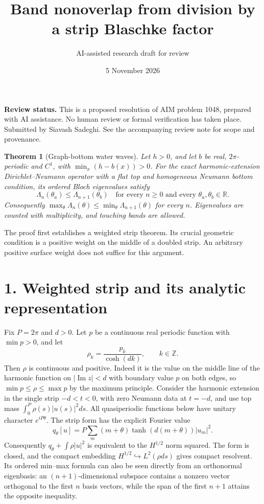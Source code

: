 \documentclass[11pt]{article}
\newtheorem{theorem}{Theorem}
\begin{document}
\title{Band nonoverlap from division by a strip Blaschke factor}
\author{AI-assisted research draft for review}
\date{5 November 2026}
\maketitle
\noindent\textbf{Review status.} This is a proposed resolution of AIM problem
1048, prepared with AI assistance. No human review or formal verification
has taken place. Submitted by Siavash Sadeghi. See the accompanying review
note for scope and provenance.


\begin{theorem}[Graph-bottom water waves]
Let $h>0$, and let $b$ be real, $2\pi$-periodic and $C^1$, with
$\min_x(h-b(x))>0$. For the exact harmonic-extension
Dirichlet--Neumann operator with a flat top and homogeneous Neumann
bottom condition, its ordered Bloch eigenvalues satisfy
\[
 \Lambda_n(\theta_a)\le\Lambda_{n+1}(\theta_b)
 \quad\text{for every }n\ge0\text{ and every }\theta_a,\theta_b\in\mathbb R.
 \tag{1}
\]
Consequently $\max_\theta\Lambda_n(\theta)\le
\min_\theta\Lambda_{n+1}(\theta)$ for every $n$. Eigenvalues are counted
with multiplicity, and touching bands are allowed.
\end{theorem}

The proof first establishes a weighted strip theorem. Its crucial
geometric condition is a positive weight on the middle of a doubled
strip. An arbitrary positive surface weight does not suffice for this
argument.

\section*{1. Weighted strip and its analytic representation}
Fix $P=2\pi$ and $d>0$. Let $p$ be a continuous real periodic function
with $\min p>0$, and let
\[
 \rho_k=\frac{p_k}{\cosh(dk)},\qquad k\in\mathbb Z. \tag{2}
\]
Then $\rho$ is continuous and positive. Indeed it is the value on the
middle line of the harmonic function on $|\operatorname{Im}z|<d$ with
boundary value $p$ on both edges, so $\min p\le\rho\le\max p$ by the
maximum principle. Consider the harmonic extension in the single
strip $-d<t<0$, with zero Neumann data at $t=-d$, and use top mass
$\int_0^P\rho(s)|u(s)|^2ds$. All quasiperiodic functions below have
unitary character $e^{iP\theta}$.
The strip form has the explicit Fourier value
\[
 q_\theta[u]=P\sum_m (m+\theta)\tanh(d(m+\theta))|u_m|^2.
\]
Consequently $q_\theta+\int\rho|u|^2$ is equivalent to the
$H^{1/2}$ norm squared. The form is closed, and the compact embedding
$H^{1/2}\hookrightarrow L^2(\rho ds)$ gives compact resolvent.
Its ordered min--max formula can also be seen directly from an
orthonormal eigenbasis: an $(n+1)$-dimensional subspace contains a
nonzero vector orthogonal to the first $n$ basis vectors, while the
span of the first $n+1$ attains the opposite inequality.
\end{document}
